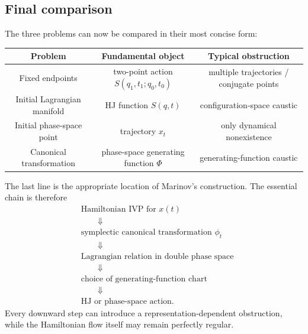 \subsection{Final comparison}
The three problems can now be compared in their most concise form:
\begin{center}
\begin{tabular}{c|c|c}
\hline
Problem & Fundamental object & Typical obstruction\\
\hline
Fixed endpoints
&
two-point action \(S(q_1,t_1;q_0,t_0)\)
&
multiple trajectories / conjugate points
\\
Initial Lagrangian manifold
&
HJ function \(S(q,t)\)
&
configuration-space caustic
\\
Initial phase-space point
&
trajectory \(x_t\)
&
only dynamical nonexistence
\\
Canonical transformation
&
phase-space generating function \(\Phi\)
&
generating-function caustic
\\
\hline
\end{tabular}
\end{center}
The last line is the appropriate location of Marinov's construction.
The essential chain is therefore
\begin{equation}
\boxed{
\begin{aligned}
&\text{Hamiltonian IVP for }x(t)
\\
&\qquad\Downarrow
\\
&\text{symplectic canonical transformation }\phi_t
\\
&\qquad\Downarrow
\\
&\text{Lagrangian relation in double phase space}
\\
&\qquad\Downarrow
\\
&\text{choice of generating-function chart}
\\
&\qquad\Downarrow
\\
&\text{HJ or phase-space action}.
\end{aligned}}
\end{equation}
Every downward step can introduce a representation-dependent obstruction,
while the Hamiltonian flow itself may remain perfectly regular.
